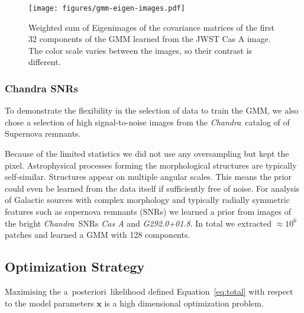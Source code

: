 \documentclass[twocolumn]{aastex631}
\newcommand{\chandra}{\textit{Chandra}~}
\newcommand{\aposteriori}{a~posteriori~}
\newcommand{\todo}[1]{\textcolor{red}{TODO: #1}\PackageWarning{TODO:}{#1!}}
\begin{document}

    \begin{figure}
        \begin{centering}
            \texttt{[image: figures/gmm-eigen-images.pdf]}
            \caption{
                Weighted sum of Eigenimages of the covariance matrices of the first $32$ components of the GMM learned from the JWST Cas A image. The color scale varies between the images, so their contrast is different. 
            }
            \label{fig:gmm-eigen-images}
        \end{centering}
    \end{figure}

    \subsubsection{Chandra SNRs}
    \label{sssec:chandra-snrs}
    To demonstrate the flexibility in the selection of data to train the GMM, we also chose a selection of high signal-to-noise images from the \chandra catalog of of Supernova remnants.
    
    
    Because of the limited statistics we did not use any oversampling but kept the pixel. Astrophysical processes forming the morphological structures are typically self-similar. Structures appear on multiple angular scales. This means the prior could even be learned from the data itself if sufficiently free of noise. For analysis of Galactic sources with complex morphology and typically radially symmetric features such as supernova remnants (SNRs) we learned a prior from images of the bright \chandra SNRs \textit{Cas A} and \textit{G292.0+01.8}. In total we extracted $\approx 10^6$ patches and learned a GMM with 128 components.
    
    \subsection{Optimization Strategy}
    Maximising the \aposteriori likelihood defined Equation~\ref{eq:total} with respect to the model parameters $\mathbf{x}$ is a high dimensional optimization problem.
    
\end{document}
